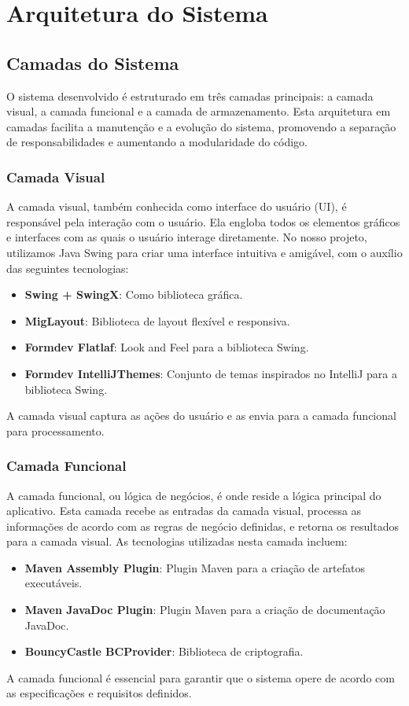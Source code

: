 \documentclass[../main.tex]{subfiles}
\begin{document}
\section{Arquitetura do Sistema}
\subsection{Camadas do Sistema}

O sistema desenvolvido é estruturado em três camadas principais: a camada visual, a camada funcional e a camada de armazenamento. Esta arquitetura em camadas facilita a manutenção e a evolução do sistema, promovendo a separação de responsabilidades e aumentando a modularidade do código.

\subsubsection{Camada Visual}
A camada visual, também conhecida como interface do usuário (UI), é responsável pela interação com o usuário. Ela engloba todos os elementos gráficos e interfaces com as quais o usuário interage diretamente. No nosso projeto, utilizamos Java Swing para criar uma interface intuitiva e amigável, com o auxílio das seguintes tecnologias:
\begin{itemize}
    \item \textbf{Swing + SwingX}: Como biblioteca gráfica.
    \item \textbf{MigLayout}: Biblioteca de layout flexível e responsiva. 
    \item \textbf{Formdev Flatlaf}: Look and Feel para a biblioteca Swing.
    \item \textbf{Formdev IntelliJThemes}: Conjunto de temas inspirados no IntelliJ para a biblioteca Swing.
\end{itemize}
A camada visual captura as ações do usuário e as envia para a camada funcional para processamento.

\subsubsection{Camada Funcional}
A camada funcional, ou lógica de negócios, é onde reside a lógica principal do aplicativo. Esta camada recebe as entradas da camada visual, processa as informações de acordo com as regras de negócio definidas, e retorna os resultados para a camada visual. As tecnologias utilizadas nesta camada incluem:
\begin{itemize}
    \item \textbf{Maven Assembly Plugin}: Plugin Maven para a criação de artefatos executáveis.
    \item \textbf{Maven JavaDoc Plugin}: Plugin Maven para a criação de documentação JavaDoc.
    \item \textbf{BouncyCastle BCProvider}: Biblioteca de criptografia.
\end{itemize}
A camada funcional é essencial para garantir que o sistema opere de acordo com as especificações e requisitos definidos.
\end{document}
